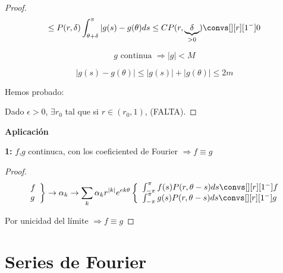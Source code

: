\begin{itemize}
\begin{theorem}
\begin{proof}
					\[\leq P(r, \delta) \int^{\pi}_{\theta+\delta} |g(s) - g(\theta) ds \leq C P(r, \underbrace{\delta}_{> 0}) \convs[][r][1^-] 0  \]

					\[g \text{ continua } \Rightarrow |g| < M \]

					\[ |g(s)  - g(\theta)| \leq |g(s)| + | g(\theta) | \leq 2m \]


					Hemos probado:

					Dado $\epsilon > 0$, $\exists r_0$ tal que si $r \in (r_0,1)$, (FALTA).

				\end{proof}

			\end{theorem}

			\textbf{Aplicación}

			\textbf{1:} $f$,$g$ continuca, con los  coeficiented de Fourier $\Rightarrow f \equiv g$

			\begin{proof}
				\[
					\left. \begin{array}{l}
					f \\
					g
					\end{array} \right\} \rightarrow \alpha_k \rightarrow \sum_k \alpha_k r^{|k|} e^{ek\theta} \left\{ \begin{array}{l}
						\int^{\pi}_{-\pi} f(s) P(r, \theta - s)ds \convs[][r][1^-] f \\
						\int^{\pi}_{-\pi} g(s) P(r, \theta - s)ds \convs[][r][1^-] g
					\end{array} \right.
				\]

				Por unicidad del límite $\Rightarrow f \equiv g$
			\end{proof}




		\end{itemize}































\section{Series de Fourier}